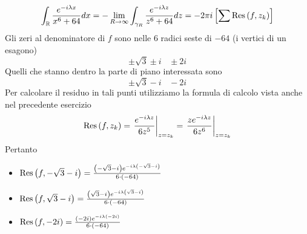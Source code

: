\begin{equation*}
\int _{\mathbb{R} }\frac{e^{-i\lambda x}}{x^{6} +64} dx=-\lim\limits _{R\rightarrow \infty }\int _{\gamma _{R}}\frac{e^{-i\lambda z}}{z^{6} +64} dz=-2\pi i\left[\sum \operatorname{Res} \left( f,z_{k}\right)\right]
\end{equation*}
Gli zeri al denominatore di $f$ sono nelle $6$ radici seste di $-64$ (i vertici di un esagono)
\begin{equation*}
\pm \sqrt{3} \pm i\ \ \ \ \pm 2i
\end{equation*}
Quelli che stanno dentro la parte di piano interessata sono
\begin{equation*}
\pm \sqrt{3} -i\ \ \ \ -2i
\end{equation*}
Per calcolare il residuo in tali punti utilizziamo la formula di calcolo vista anche nel precedente esercizio
\begin{equation*}
\operatorname{Res} \left( f,z_{k}\right) =\left. \frac{e^{-i\lambda z}}{6z^{5}}\right| _{z=z_{k}} =\left. \frac{ze^{-i\lambda z}}{6z^{6}}\right| _{z=z_{k}}
\end{equation*}
Pertanto
\begin{itemize}
\item $\operatorname{Res} \left( f,-\sqrt{3} -i\right) =\frac{\left( -\sqrt{3} -i\right) e^{-i\lambda \left( -\sqrt{3} -i\right)}}{6\cdotp \left( -64\right)}$
\item $\operatorname{Res} \left( f,\sqrt{3} -i\right) =\frac{\left(\sqrt{3} -i\right) e^{-i\lambda \left(\sqrt{3} -i\right)}}{6\cdotp \left( -64\right)}$
\item $\operatorname{Res} \left( f,-2i\right) =\frac{\left( -2i\right) e^{-i\lambda \left( -2i\right)}}{6\cdotp \left( -64\right)}$
\end{itemize}

